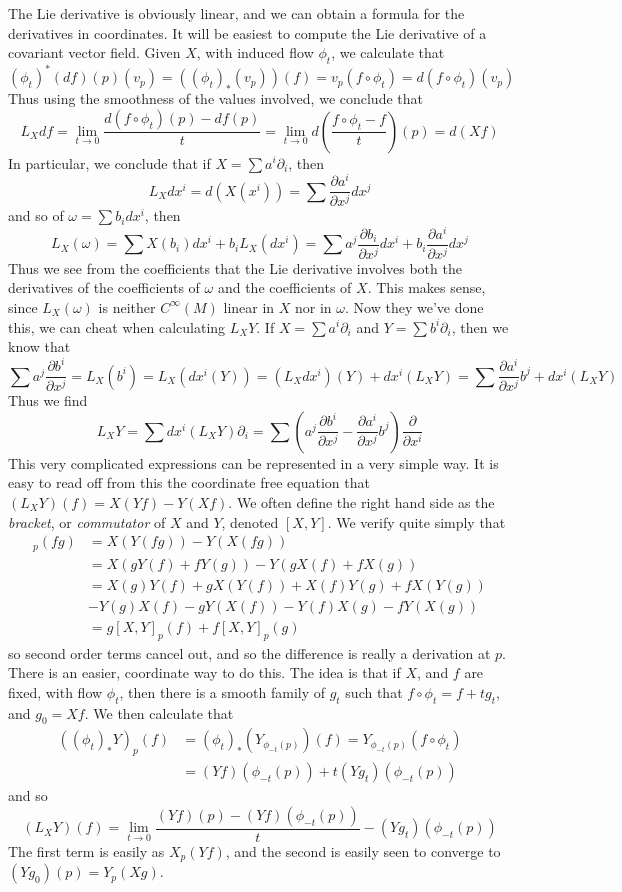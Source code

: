 The Lie derivative is obviously linear, and we can obtain a formula for the derivatives in coordinates. It will be easiest to compute the Lie derivative of a covariant vector field. Given $X$, with induced flow $\phi_t$, we calculate that
%
\[ (\phi_t)^*(df)(p)(v_p) = ((\phi_t)_*(v_p))(f) = v_p(f \circ \phi_t) = d(f \circ \phi_t)(v_p) \]
%
Thus using the smoothness of the values involved, we conclude that
%
\[ L_X df = \lim_{t \to 0} \frac{d(f \circ \phi_t)(p) - df(p)}{t} = \lim_{t \to 0} d \left( \frac{f \circ \phi_t - f}{t} \right)(p) = d(Xf) \]
%
In particular, we conclude that if $X = \sum a^i \partial_i$, then
%
\[ L_X dx^i = d(X(x^i)) = \sum \frac{\partial a^i}{\partial x^j} dx^j \]
%
and so of $\omega = \sum b_i dx^i$, then
%
\[ L_X(\omega) = \sum X(b_i) dx^i + b_i L_X(dx^i) = \sum a^j \frac{\partial b_i}{\partial x^j} dx^i + b_i \frac{\partial a^i}{\partial x^j} dx^j \]
%
Thus we see from the coefficients that the Lie derivative involves both the derivatives of the coefficients of $\omega$ and the coefficients of $X$. This makes sense, since $L_X(\omega)$ is neither $C^\infty(M)$ linear in $X$ nor in $\omega$. Now they we've done this, we can cheat when calculating $L_X Y$. If $X = \sum a^i \partial_i$ and $Y = \sum b^i \partial_i$, then we know that
%
\[ \sum a^j \frac{\partial b^i}{\partial x^j} = L_X(b^i) = L_X(dx^i(Y)) = (L_X dx^i)(Y) + dx^i(L_X Y) = \sum \frac{\partial a^i}{\partial x^j} b^j + dx^i(L_X Y) \]
%
Thus we find
%
\[ L_X Y = \sum dx^i(L_X Y) \partial_i = \sum \left( a^j \frac{\partial b^i}{\partial x^j} - \frac{\partial a^i}{\partial x^j} b^j \right) \frac{\partial}{\partial x^i} \]
%
This very complicated expressions can be represented in a very simple way. It is easy to read off from this the coordinate free equation that $(L_X Y)(f) = X(Yf) - Y(Xf)$. We often define the right hand side as the \emph{bracket}, or \emph{commutator} of $X$ and $Y$, denoted $[X,Y]$. We verify quite simply that
%
\begin{align*}
    [X,Y]_p(fg) &= X(Y(fg)) - Y(X(fg))\\
    &= X(gY(f) + fY(g)) - Y(gX(f) + fX(g))\\
    &= X(g)Y(f) + gX(Y(f)) + X(f)Y(g) + fX(Y(g))\\
    &- Y(g)X(f) - gY(X(f)) - Y(f)X(g) - fY(X(g))\\
    &= g [X,Y]_p(f) + f [X,Y]_p(g)
\end{align*}
%
so second order terms cancel out, and so the difference is really a derivation at $p$. There is an easier, coordinate way to do this. The idea is that if $X$, and $f$ are fixed, with flow $\phi_t$, then there is a smooth family of $g_t$ such that $f \circ \phi_t = f + t g_t$, and $g_0 = Xf$. We then calculate that
%
\begin{align*}
    ((\phi_t)_* Y)_p(f) &= (\phi_t)_*(Y_{\phi_{-t}(p)})(f) = Y_{\phi_{-t}(p)}(f \circ \phi_t)\\
    &= (Yf)(\phi_{-t}(p)) + t (Yg_t)(\phi_{-t}(p))
\end{align*}
%
and so
%
\[ (L_X Y)(f) = \lim_{t \to 0} \frac{(Yf)(p) - (Yf)(\phi_{-t}(p))}{t} - (Yg_t)(\phi_{-t}(p)) \]
%
The first term is easily as $X_p(Yf)$, and the second is easily seen to converge to $(Yg_0)(p) = Y_p(Xg)$.

